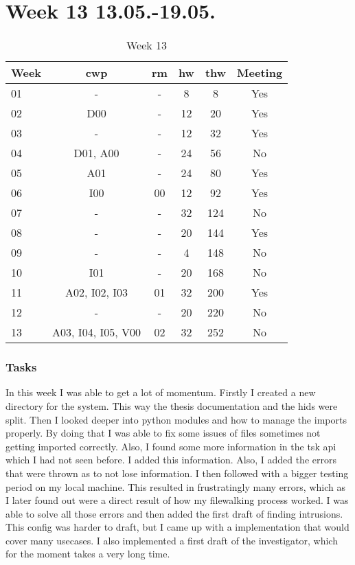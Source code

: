 \section{Week 13 13.05.-19.05.}
\label{sec:journal:week13}

\begin{table}[!ht]
    \begin{center}
        \caption{Week 13}
        \label{tab:journal:week13}
        \begin{tabular}{l|c|c|c|c|c}
            \textbf{Week} & \textbf{\gls{cwp}} & \textbf{\gls{rm}} & \textbf{\gls{hw}} & \textbf{\gls{thw}} & \textbf{Meeting}\\
        \hline
        01 & - & - & 8 & 8 & Yes \\
        02 & D00 & - & 12 & 20 & Yes \\
        03 & - & - & 12 & 32 & Yes \\
        04 & D01, A00 & - & 24 & 56 & No \\
        05 & A01 & - & 24 & 80 & Yes \\
        06 & I00 & 00 & 12 & 92 & Yes \\
        07 & - & - & 32 & 124 & No \\
        08 & - & - & 20 & 144 & Yes \\
        09 & - & - & 4 & 148 & No \\
        10 & I01 & - & 20 & 168 & No \\
        11 & A02, I02, I03 & 01 & 32 & 200 & Yes \\
        12 & - & - & 20 & 220 & No \\
        13 & A03, I04, I05, V00 & 02 & 32 & 252 & No \\
        \end{tabular}
    \end{center}
\end{table}

\subsubsection{Tasks}

In this week I was able to get a lot of momentum. Firstly I created a new directory for the system. This way the thesis documentation and the \gls{hids} were split. Then I looked deeper into python modules and how to manage the imports properly. By doing that I was able to fix some issues of files sometimes not getting imported correctly. Also, I found some more information in the \gls{tsk} \gls{api} which I had not seen before. I added this information. Also, I added the errors that were thrown as to not lose information. I then followed with a bigger testing period on my local machine. This resulted in frustratingly many errors, which as I later found out were a direct result of how my filewalking process worked. I was able to solve all those errors and then added the first draft of finding intrusions. This config was harder to draft, but I came up with a implementation that would cover many usecases. I also implemented a first draft of the investigator, which for the moment takes a very long time.

